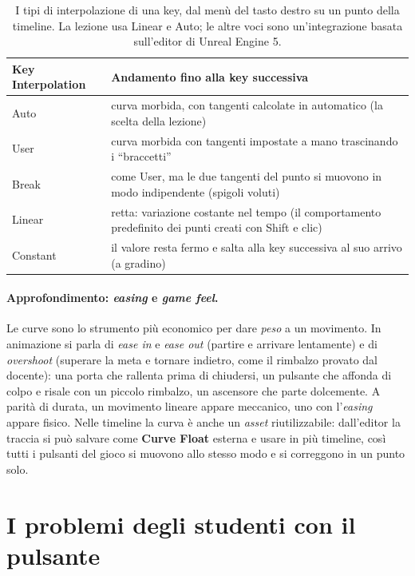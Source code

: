 \begin{table}[htbp]
\centering
\small
\begin{tabular}{@{}p{3.0cm}p{11.0cm}@{}}
\toprule
\textbf{Key Interpolation} & \textbf{Andamento fino alla key successiva} \\
\midrule
Auto & curva morbida, con tangenti calcolate in automatico (la scelta della lezione) \\
User & curva morbida con tangenti impostate a mano trascinando i ``braccetti'' \\
Break & come User, ma le due tangenti del punto si muovono in modo indipendente
(spigoli voluti) \\
Linear & retta: variazione costante nel tempo (il comportamento predefinito dei punti
creati con Shift e clic) \\
Constant & il valore resta fermo e salta alla key successiva al suo arrivo (a
gradino) \\
\bottomrule
\end{tabular}
\caption{I tipi di interpolazione di una key, dal menù del tasto destro su un punto della
timeline. La lezione usa Linear e Auto; le altre voci sono un'integrazione basata
sull'editor di Unreal Engine 5.}
\label{ue7:tab:interp}
\end{table}

\paragraph{Approfondimento: \emph{easing} e \emph{game feel}.} Le curve sono lo strumento
più economico per dare \emph{peso} a un movimento. In animazione si parla di
\emph{ease in} e \emph{ease out} (partire e arrivare lentamente) e di
\emph{overshoot} (superare la meta e tornare indietro, come il rimbalzo provato dal
docente): una porta che rallenta prima di chiudersi, un pulsante che affonda di colpo e
risale con un piccolo rimbalzo, un ascensore che parte dolcemente. A parità di durata,
un movimento lineare appare meccanico, uno con l'\emph{easing} appare fisico. Nelle
timeline la curva è anche un \emph{asset} riutilizzabile: dall'editor la traccia si può
salvare come \textbf{Curve Float} esterna e usare in più timeline, così tutti i pulsanti
del gioco si muovono allo stesso modo e si correggono in un punto solo.

\section{I problemi degli studenti con il pulsante}
\label{ue7:sec:problemibottone}

